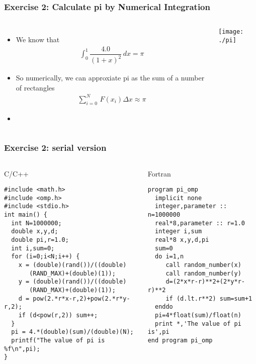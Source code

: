 \documentclass[slidestop,mathserif,compress,xcolor=svgnames]{beamer}
\newenvironment{eblock}[0]
{
\begin{beamerboxesrounded}[upper=uppercol2,lower=lowercol2,shadow=true]}
{\end{beamerboxesrounded}}
\begin{document}
\begin{frame}
  \frametitle{\small Exercise 2: Calculate pi by Numerical Integration}
  \begin{columns}
    \column{5cm}
    \begin{itemize}
      \item We know that
      \begin{align*}
        \int^1_0 \dfrac{4.0}{(1+x)^2}\, dx = \pi
      \end{align*}
      \item So numerically, we can approxiate pi as the sum of a number of rectangles
      \begin{align*}
        \sum^N_{i=0}\,F(x_i)\Delta x \approx \pi
      \end{align*}
      \item[] 
    \end{itemize}
    \column{5cm}
    \begin{center}
      \texttt{[image: ./pi]}
    \end{center}
  \end{columns}
\end{frame}

\begin{frame}[fragile]
  \frametitle{\small Exercise 2: serial version}
  \begin{columns}
    \column{5cm}
    \begin{eblock}{C/C++}
      {\tiny
        \begin{verbatim}
#include <math.h>
#include <omp.h>
#include <stdio.h>
int main() {
  int N=1000000;
  double x,y,d;
  double pi,r=1.0;
  int i,sum=0;
  for (i=0;i<N;i++) {
    x = (double)(rand())/((double)
       (RAND_MAX)+(double)(1));
    y = (double)(rand())/((double)
       (RAND_MAX)+(double)(1));
    d = pow(2.*r*x-r,2)+pow(2.*r*y-r,2);
    if (d<pow(r,2)) sum++;
  }
  pi = 4.*(double)(sum)/(double)(N);
  printf("The value of pi is %f\n",pi);
}
        \end{verbatim}
      }
    \end{eblock}
    \column{5cm}
    \begin{eblock}{Fortran}
      {\tiny
        \begin{verbatim}
program pi_omp
  implicit none
  integer,parameter :: n=1000000
  real*8,parameter :: r=1.0
  integer i,sum
  real*8 x,y,d,pi
  sum=0
  do i=1,n
     call random_number(x)
     call random_number(y)
     d=(2*x*r-r)**2+(2*y*r-r)**2
     if (d.lt.r**2) sum=sum+1
  enddo
  pi=4*float(sum)/float(n)
  print *,'The value of pi is',pi
end program pi_omp
        \end{verbatim}
      }
    \end{eblock}
  \end{columns}
\end{frame}
\end{document}
